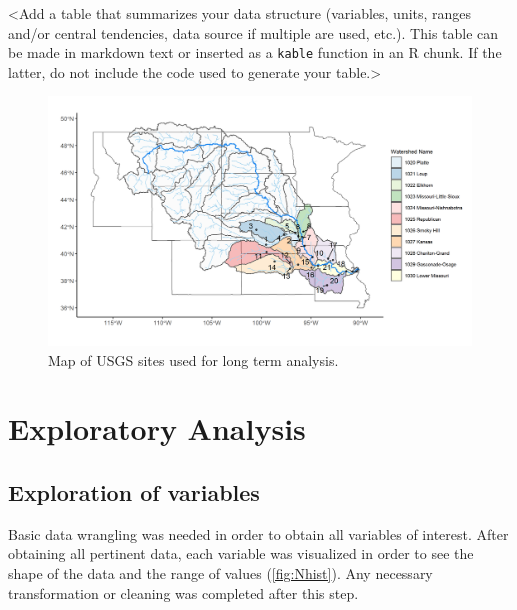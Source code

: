 \documentclass[12pt,]{article}
\makeatletter
\def\maxwidth{\ifdim\Gin@nat@width>\linewidth\linewidth\else\Gin@nat@width\fi}
\makeatother
\begin{document}
\textless{}Add a table that summarizes your data structure (variables,
units, ranges and/or central tendencies, data source if multiple are
used, etc.). This table can be made in markdown text or inserted as a
\texttt{kable} function in an R chunk. If the latter, do not include the
code used to generate your table.\textgreater{}

\begin{figure}[H]
\includegraphics[width=\maxwidth]{../Figures/site_map} \caption{\label{fig:sitemap} Map of USGS sites used for long term analysis.}\label{fig:sitemap}
\end{figure}

\newpage

\hypertarget{exploratory-analysis}{%
\section{Exploratory Analysis}\label{exploratory-analysis}}

\hypertarget{exploration-of-variables}{%
\subsection{Exploration of variables}\label{exploration-of-variables}}

Basic data wrangling was needed in order to obtain all variables of
interest. After obtaining all pertinent data, each variable was
visualized in order to see the shape of the data and the range of values
(\autoref{fig:Nhist}). Any necessary transformation or cleaning was
completed after this step.
\end{document}
